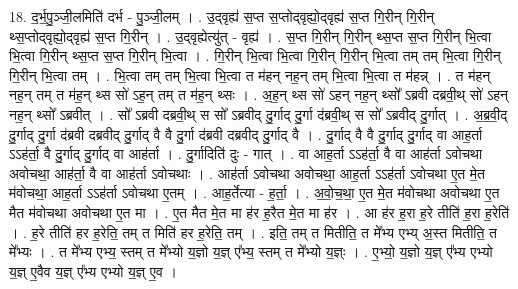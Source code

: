\documentclass[17pt]{extarticle}
\begin{document}
18. द॒र्भ॒पु॒ञ्जी॒लमिति॑ दर्भ - पु॒ञ्जी॒लम् । . उ॒द्‌वृह्य॑ स॒प्त स॒प्तोद्‌वृह्यो॒द्‌वृह्य॑ स॒प्त गि॒रीन् गि॒रीन् थ्स॒प्तोद्‌वृह्यो॒द्‌वृह्य॑ स॒प्त गि॒रीन् । . उ॒द्‌वृह्येत्यु॑त् - वृह्य॑ । . स॒प्त गि॒रीन् गि॒रीन् थ्स॒प्त स॒प्त गि॒रीन् भि॒त्वा भि॒त्वा गि॒रीन् थ्स॒प्त स॒प्त गि॒रीन् भि॒त्वा । . गि॒रीन् भि॒त्वा भि॒त्वा गि॒रीन् गि॒रीन् भि॒त्वा तम् तम् भि॒त्वा गि॒रीन् गि॒रीन् भि॒त्वा तम् । . भि॒त्वा तम् तम् भि॒त्वा भि॒त्वा त म॑हन् नह॒न् तम् भि॒त्वा भि॒त्वा त म॑हन्न् । . त म॑हन् नह॒न् तम् त म॑ह॒न् थ्स सो॑ ऽह॒न् तम् त म॑ह॒न् थ्सः । . अ॒ह॒न् थ्स सो॑ ऽहन् नह॒न् थ्सो᳚ ऽब्रवी दब्रवी॒थ् सो॑ ऽहन् नह॒न् थ्सो᳚ ऽब्रवीत् । . सो᳚ ऽब्रवी दब्रवी॒थ् स सो᳚ ऽब्रवीद् दु॒र्गाद् दु॒र्गा द॑ब्रवी॒थ् स सो᳚ ऽब्रवीद् दु॒र्गात् । . अ॒ब्र॒वी॒द् दु॒र्गाद् दु॒र्गा द॑ब्रवी दब्रवीद् दु॒र्गाद् वै वै दु॒र्गा द॑ब्रवी दब्रवीद् दु॒र्गाद् वै । . दु॒र्गाद् वै वै दु॒र्गाद् दु॒र्गाद् वा आह॒र्ता ऽऽह॑र्ता॒ वै दु॒र्गाद् दु॒र्गाद् वा आह॑र्ता । . दु॒र्गादिति॑ दुः - गात् । . वा आह॒र्ता ऽऽह॑र्ता॒ वै वा आह॑र्ता ऽवोचथा अवोचथा॒ आह॑र्ता॒ वै वा आह॑र्ता ऽवोचथाः । . आह॑र्ता ऽवोचथा अवोचथा॒ आह॒र्ता ऽऽह॑र्ता ऽवोचथा ए॒त मे॒त म॑वोचथा॒ आह॒र्ता ऽऽह॑र्ता ऽवोचथा ए॒तम् । . आह॒र्तेत्या - ह॒र्ता॒ । . अ॒वो॒च॒था॒ ए॒त मे॒त म॑वोचथा अवोचथा ए॒त मैत म॑वोचथा अवोचथा ए॒त मा । . ए॒त मैत मे॒त मा ह॑र ह॒रैत मे॒त मा ह॑र । . आ ह॑र ह॒रा ह॒रे तीति॑ ह॒रा ह॒रेति॑ । . ह॒रे तीति॑ हर ह॒रेति॒ तम् त मिति॑ हर ह॒रेति॒ तम् । . इति॒ तम् त मितीति॒ त मे᳚भ्य एभ्य् अ॒स्त मितीति॒ त मे᳚भ्यः । . त मे᳚भ्य एभ्य॒ स्तम् त मे᳚भ्यो य॒ज्ञो य॒ज्ञ् ए᳚भ्य॒ स्तम् त मे᳚भ्यो य॒ज्ञ्ः । . ए॒भ्यो॒ य॒ज्ञो य॒ज्ञ् ए᳚भ्य एभ्यो य॒ज्ञ् ए॒वैव य॒ज्ञ् ए᳚भ्य एभ्यो य॒ज्ञ् ए॒व । \newline
\end{document}
